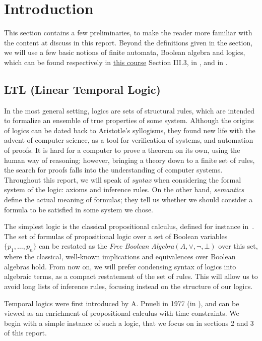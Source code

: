 \documentclass[11pt]{article}
\newcommand{\orr}{{\vee}}
\theoremstyle{definition}
\begin{document}
\section{Introduction}\label{SecIntro}
This section contains a few preliminaries, to make the reader more familiar with the
content at discuss in this report. Beyond the definitions given in the section, we
will use
a few basic notions of finite automata, Boolean algebra and logics,
which can be found respectively in \href{https://www.irif.fr/~jep/PDF/MPRI/MPRI.pdf}{this course} Section III.3,
in \cite[Section 1.2]{GehvG22}, and in \cite[Section 3]{PropLog}.

\subsection{LTL (Linear Temporal Logic)}
In the most general setting, logics are sets of structural rules, which are intended to
formalize an ensemble of true properties of some system. Although the origins of logics can 
be dated back to Aristotle's syllogisms, they found new life with the advent of computer 
science, as a tool for verification of systems, and automation of proofs. It is hard
for a computer to prove a theorem on its own, using the human way of reasoning; however,
bringing a theory down to a finite set of rules, the search for proofs falls into the 
understanding of computer systems. Throughout this report, we will speak of \emph{syntax} when
considering the formal system of the logic: axioms and inference rules. On the other hand,
\emph{semantics} define the actual meaning of formulas; they tell us whether we should consider a
formula to be satisfied in some system we chose.

The simplest logic is the classical propositional calculus, defined for instance in~\cite[Section 3]{PropLog}. 
The set of formulas of propositional logic over a set of Boolean variables 
$\{p_1,\ldots,p_n\}$ can be restated as the \emph{Free Boolean Algebra}\cite[Section 4.1]{GehvG22}$(A,\orr,\neg,\bot)$
over this set,
where the classical, well-known implications and equivalences over Boolean algebras hold. From now
on, we will prefer condensing syntax of logics into algebraic terms, as a compact restatement of the set of rules.
This will allow us to avoid long lists of inference rules, focusing instead on the
structure of our logics.

Temporal logics were first introduced by A. Pnueli in 1977 (in \cite{Pnu77}), and can be
viewed as an enrichment of propositional calculus with time constraints. We begin with a simple
instance of such a logic, that we focus on in sections 2 and 3 of this report.
\end{document}
